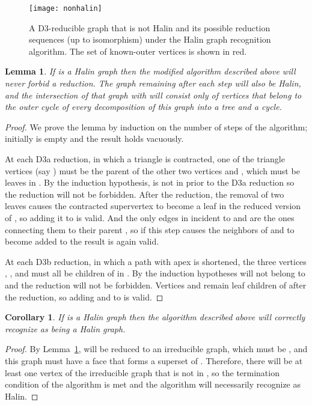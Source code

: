 \documentclass{article}
\newtheorem{lemma}{Lemma}
\newtheorem{corollary}{Corollary}
\begin{document}
\begin{figure}[t]
\centering
\texttt{[image: nonhalin]}
\caption{A D3-reducible graph that is not Halin and its possible reduction sequences (up to isomorphism) under the Halin graph recognition algorithm. The set of known-outer vertices is shown in red.}
\label{fig:nonhalin}
\end{figure}


\begin{lemma}
\label{lem:Halin-subset}
If  is a Halin graph then the
modified algorithm described above will never forbid a reduction. The graph remaining after each step will also be Halin, and the intersection of that graph with  will consist only of vertices that belong to the outer cycle of every decomposition of this graph into a tree and a cycle.
\end{lemma}

\begin{proof}
We prove the lemma by induction on the number of steps of the algorithm; initially  is empty and the result holds vacuously.

At each D3a reduction, in which a triangle  is contracted, one of the triangle vertices (say ) must be the parent of the other two vertices  and , which must be leaves in . By the induction hypothesis,  is not in  prior to the D3a reduction so the reduction will not be forbidden. After the reduction, the removal of two leaves causes the contracted supervertex to become a leaf in the reduced version of , so adding it to  is valid. And the only edges in  incident to  and  are the ones connecting them to their parent , so if this step causes the neighbors of  and  to become added to  the result is again valid.

At each D3b reduction, in which a path  with apex  is shortened, the three vertices , , and  must all be children of  in . By the induction hypotheses  will not belong to  and the reduction will not be forbidden. Vertices  and  remain leaf children of  after the reduction, so adding  and  to  is valid.
\end{proof}

\begin{corollary}
\label{cor:no-false-neg}
If  is a Halin graph then the algorithm described above will correctly recognize  as being a Halin graph.
\end{corollary}

\begin{proof}
By Lemma~\ref{lem:Halin-subset},  will be reduced to an irreducible graph, which must be , and this graph must have a face that forms a superset of .
Therefore, there will be at least one vertex of the irreducible graph that is not in , so the termination condition of the algorithm is met and the algorithm will necessarily recognize  as Halin.
\end{proof}
\end{document}
